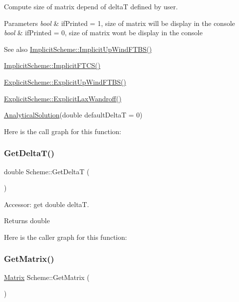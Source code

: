 Compute size of matrix depend of deltaT defined by user. 
\begin{DoxyParams}{Parameters}
{\em bool} & if\+Printed = 1, size of matrix will be display in the console \\
\hline
{\em bool} & if\+Printed = 0, size of matrix won\textquotesingle{}t be display in the console \\
\hline
\end{DoxyParams}
\begin{DoxySeeAlso}{See also}
\mbox{\hyperlink{class_implicit_scheme_ab8311a005d69690622e0ddaa0dcff94d}{Implicit\+Scheme\+::\+Implicit\+Up\+Wind\+F\+T\+B\+S()}} 

\mbox{\hyperlink{class_implicit_scheme_afd2b8e73e914a04c326b8cba0d5810ce}{Implicit\+Scheme\+::\+Implicit\+F\+T\+C\+S()}} 

\mbox{\hyperlink{class_explicit_scheme_a52c0d19315a6014f43a9d007c70582d6}{Explicit\+Scheme\+::\+Explicit\+Up\+Wind\+F\+T\+B\+S()}} 

\mbox{\hyperlink{class_explicit_scheme_a2698e08e62763c56b972b478d665c34c}{Explicit\+Scheme\+::\+Explicit\+Lax\+Wandroff()}} 

\mbox{\hyperlink{class_scheme_a7d3e9f8133a955517471eb7a6fea355f}{Analytical\+Solution}}(double default\+DeltaT = 0) 
\end{DoxySeeAlso}
Here is the call graph for this function\+:
\mbox{\label{class_scheme_af05aa7671d5c080c0cca501cb6717cd0}} 
\subsubsection{\texorpdfstring{Get\+Delta\+T()}{GetDeltaT()}}
{\footnotesize\ttfamily double Scheme\+::\+Get\+DeltaT (\begin{DoxyParamCaption}{ }\end{DoxyParamCaption})}

Accessor\+: get double deltaT. \begin{DoxyReturn}{Returns}
double 
\end{DoxyReturn}
Here is the caller graph for this function\+:
\mbox{\label{class_scheme_a14c333d182a6b4e94aa2a346000257ea}} 
\subsubsection{\texorpdfstring{Get\+Matrix()}{GetMatrix()}}
{\footnotesize\ttfamily \mbox{\hyperlink{class_matrix}{Matrix}} Scheme\+::\+Get\+Matrix (\begin{DoxyParamCaption}{ }\end{DoxyParamCaption})}

